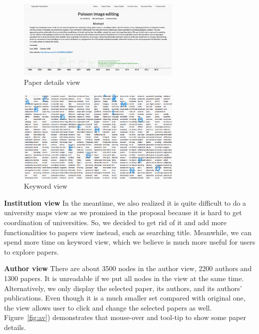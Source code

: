 \begin{figure}[ht]			
	\centering
	\includegraphics[width=0.7\textwidth]{paper_details}
	\caption{Paper details view}
	\label{fig:pd}
\end{figure}

\begin{figure}[ht]			
    \centering
    \includegraphics[width=0.7\textwidth]{keyword_view.png}
    \caption{Keyword view}
    \label{fig:kw}
\end{figure}


\textbf{Institution view}
In the meantime, we also realized it is quite difficult to do a university maps view as we promised in the proposal because it is hard to get coordination of universities. So, we decided to get rid of it and add more functionalities to papers view instead, such as searching title. Meanwhile, we can spend more time on keyword view, which we believe is much more useful for users to explore papers. 

\textbf{Author view}
There are about 3500 nodes in the author view, 2200 authors and 1300 papers. It is unreadable if we put all nodes in the view at the same time. Alternatively, we only display the selected paper, its authors, and its authors' publications. Even though it is a much smaller set compared with original one, the view allows user to click and change the selected papers as well. Figure~\ref{fig:av}) demonstrates that mouse-over and tool-tip to show some paper details.

